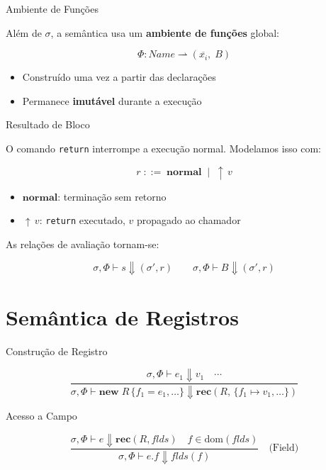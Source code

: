 \begin{frame}{Ambiente de Funções}

    Além de \(\sigma\), a semântica usa um \textbf{ambiente de funções}
    global:

    \[\Phi : \mathit{Name} \rightharpoonup (\overline{x_i},\; B)\]

    \begin{itemize}

        \item
        Construído uma vez a partir das declarações
        \item
        Permanece \textbf{imutável} durante a execução
    \end{itemize}
\end{frame}

\begin{frame}[fragile]{Resultado de Bloco}

    O comando \texttt{return} interrompe a execução normal.
    Modelamos isso com:

    \[r \;::=\; \mathbf{normal} \;\mid\; {\uparrow}\, v\]

    \begin{itemize}

        \item
        \(\mathbf{normal}\): terminação sem retorno
        \item
        \({\uparrow}\, v\): \texttt{return} executado, \(v\)
        propagado ao chamador
    \end{itemize}

    As relações de avaliação tornam-se:

    \[\sigma,\Phi \vdash s \Downarrow (\sigma', r) \qquad \sigma,\Phi \vdash B \Downarrow (\sigma', r)\]
\end{frame}


\section{Semântica de Registros}\label{semuxe2ntica-de-registros}

\begin{frame}{Construção de Registro}

    \[\frac{\sigma,\Phi \vdash e_1 \Downarrow v_1 \quad \cdots}
    {\sigma,\Phi \vdash \mathbf{new}\; R\,\{f_1\!=\!e_1,\ldots\}
    \Downarrow \mathbf{rec}(R,\,\{f_1 \mapsto v_1,\ldots\})}
    \]
\end{frame}

\begin{frame}{Acesso a Campo}

    \[\frac{\sigma,\Phi \vdash e \Downarrow \mathbf{rec}(R,\mathit{flds})
    \quad f \in \mathrm{dom}(\mathit{flds})}
    {\sigma,\Phi \vdash e.f \Downarrow \mathit{flds}(f)}
    \quad\text{(Field)}\]
\end{frame}

